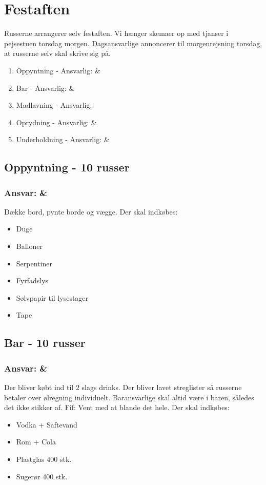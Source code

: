 \section{Festaften}
Russerne arrangerer selv festaften. Vi hænger skemaer op med tjanser i pejsestuen torsdag morgen. Dagsansvarlige annoncerer til morgenrejsning torsdag, at russerne selv skal skrive sig på.

\begin{enumerate}
\item Oppyntning - Ansvarlig: \Randildo \& \Clint
\item Bar - Ansvarlig: \Stive \& \Hemorides
\item Madlavning - Ansvarlig: 
\item Oprydning - Ansvarlig: \Farav \& \Mighty
\item Underholdning - Ansvarlig: \Karla \& \Buddha
\end{enumerate}

\subsection*{Oppyntning - 10 russer}
\subsubsection*{Ansvar: \Randildo \& \Clint}
Dække bord, pynte borde og vægge. Der skal indkøbes:
\begin{itemize}
\item Duge
\item Balloner
\item Serpentiner
\item Fyrfadslys
\item Sølvpapir til lysestager
\item Tape
\end{itemize}

\subsection*{Bar - 10 russer}
\subsubsection*{Ansvar: \Stive \& \Hemorides}
Der bliver købt ind til 2 slags drinks. Der bliver lavet streglister så russerne betaler over ølregning individuelt. Baransvarlige skal altid være i baren, således det ikke stikker af. Fif: Vent med at blande det hele. Der skal indkøbes:
\begin{itemize}
  \item Vodka + Saftevand
  \item Rom + Cola
  \item Plastglas 400 stk.
  \item Sugerør 400 stk.
\end{itemize}

